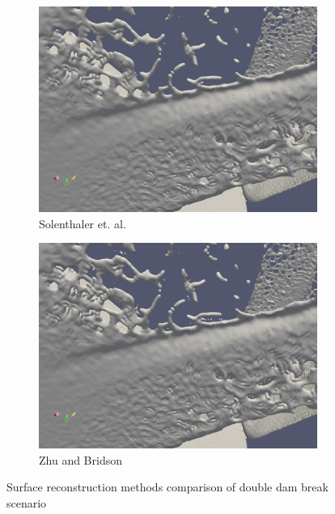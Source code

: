 \begin{figure}
\begin{center}
\begin{subfigure}[b]{0.48\textwidth}
			\includegraphics[width=\textwidth]{figures/SolenthalerEtAlForRelWorkDoubleDamBreak.png}
			\caption{Solenthaler et. al.}
		\end{subfigure}
		\begin{subfigure}[b]{0.48\textwidth}
			\includegraphics[width=\textwidth]{figures/ZhuBridsonForRelatedWorksDoubleDamBreak.png}
			\caption{Zhu and Bridson}
		\end{subfigure}

	\end{center}
	\caption{Surface reconstruction methods comparison of double dam break scenario}
	\label{fig:double_dam_break_comparison}
\end{figure}
